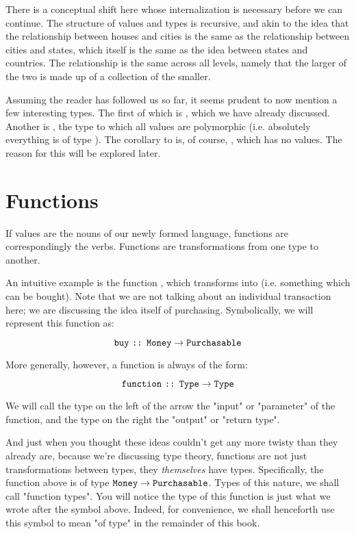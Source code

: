 There is a conceptual shift here whose internalization is necessary before we can continue. The structure of values and
types is recursive, and akin to the idea that the relationship between houses and cities is the same as the relationship
between cities and states, which itself is the same as the idea between states and countries. The relationship is the
same across all levels, namely that the larger of the two is made up of a collection of the smaller.

Assuming the reader has followed us so far, it seems prudent to now mention a few interesting types. The first of which
is , which we have already discussed. Another is , the type to which all values are
polymorphic (i.e. absolutely everything is of type ). The corollary to  is, of course,
, which has no values. The reason for this will be explored later.


\section{Functions}
If values are the nouns of our newly formed language, functions are correspondingly the verbs. Functions are
transformations from one type to another.


An intuitive example is the function , which transforms  into  (i.e.
something which can be bought). Note that we are not talking about an individual transaction here; we are discussing the
idea itself of purchasing. Symbolically, we will represent this function as:

$$ \text{\texttt{buy}} \text{ \texttt{::} } \text{\texttt{Money}} \to \text{\texttt{Purchasable}} $$

More generally, however, a function is always of the form:

$$ \text{\texttt{function}} \text{ \texttt{::} } \text{\texttt{Type}} \to \text{\texttt{Type}} $$

We will call the type on the left of the arrow the "input" or "parameter" of the function, and the type on the right the
"output" or "return type".

And just when you thought these ideas couldn't get any more twisty than they already are, because we're discussing type
theory, functions are not just transformations between types, they \textit{themselves} have types. Specifically, the
function  above is of type $\text{\texttt{Money}} \to \text{\texttt{Purchasable}}$. Types of this nature, we shall call
"function types". You will notice the type of this function is just what we wrote after the \typeof symbol above.
Indeed, for convenience, we shall henceforth use this symbol to mean "of type" in the remainder of this
book.

